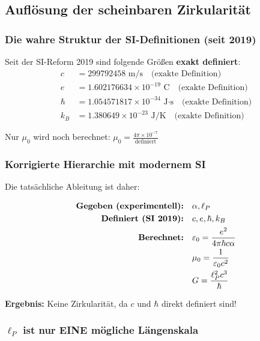 \documentclass[12pt,a4paper]{article}
\theoremstyle{definition}
\begin{document}
	\subsection{Aufl\"osung der scheinbaren Zirkularit\"at}
	
	\subsubsection{Die wahre Struktur der SI-Definitionen (seit 2019)}
	
	\begin{tcolorbox}[colback=green!5!white,colframe=green!75!black,title=Moderne SI-Basis]
		Seit der SI-Reform 2019 sind folgende Gr\"o\ss{}en \textbf{exakt definiert}:
		\begin{align}
			c &= 299792458 \text{ m/s} \quad \text{(exakte Definition)}\\
			e &= 1.602176634 \times 10^{-19} \text{ C} \quad \text{(exakte Definition)}\\
			\hbar &= 1.054571817 \times 10^{-34} \text{ J·s} \quad \text{(exakte Definition)}\\
			k_B &= 1.380649 \times 10^{-23} \text{ J/K} \quad \text{(exakte Definition)}
		\end{align}
		
		Nur $\mu_0$ wird noch berechnet: $\mu_0 = \frac{4\pi \times 10^{-7}}{\text{definiert}}$
	\end{tcolorbox}
	
	\subsubsection{Korrigierte Hierarchie mit modernem SI}
	
	Die tats\"achliche Ableitung ist daher:
	
	\begin{align}
		\text{\textbf{Gegeben (experimentell):}} &\quad \alpha, \ell_P\\
		\text{\textbf{Definiert (SI 2019):}} &\quad c, e, \hbar, k_B\\
		\text{\textbf{Berechnet:}} &\quad \varepsilon_0 = \frac{e^2}{4\pi\hbar c \alpha}\\
		&\quad \mu_0 = \frac{1}{\varepsilon_0 c^2}\\
		&\quad G = \frac{\ell_P^2 c^3}{\hbar}
	\end{align}
	
	\textbf{Ergebnis:} Keine Zirkularit\"at, da $c$ und $\hbar$ direkt definiert sind!
	
	\subsubsection{$\ell_P$ ist nur EINE m\"ogliche L\"angenskala}
	
\end{document}
